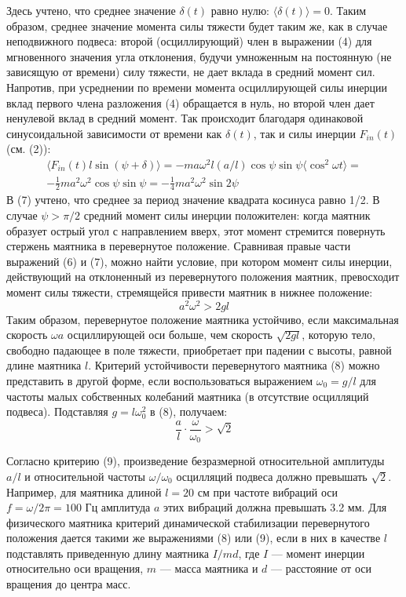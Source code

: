 \documentclass[a4paper,12pt]{article} %
\begin{document}
Здесь учтено, что среднее значение $\delta(t)$ равно нулю: $\langle\delta(t)\rangle = 0$. Таким образом, среднее значение момента силы тяжести будет таким же, как в случае неподвижного подвеса: второй (осциллирующий) член в выражении (4) для мгновенного значения угла отклонения, будучи умноженным на постоянную (не зависящую от времени) силу тяжести, не дает вклада в средний момент сил. Напротив, при усреднении по времени момента осциллирующей силы инерции вклад первого члена разложения (4) обращается в нуль, но второй член дает ненулевой вклад в средний момент. Так происходит благодаря одинаковой синусоидальной зависимости от времени как $\delta(t)$, так и силы инерции $F_{in}(t)$ (см. (2)):
\begin{eqnarray}
\langle F_{in}(t)l\sin(\psi + \delta)\rangle = -ma\omega^2l(a/l)\cos\psi\sin\psi\langle\cos^2\omega t\rangle = \nonumber\\
-\frac{1}{2}ma^2\omega^2\cos\psi\sin\psi = -\frac{1}{4}ma^2\omega^2\sin2\psi
\end{eqnarray}
В (7) учтено, что среднее за период значение квадрата косинуса равно 1/2. В случае $\psi > \pi/2$ средний момент силы инерции положителен: когда маятник образует острый угол с направлением вверх, этот момент стремится повернуть стержень маятника в перевернутое положение. Сравнивая правые части выражений (6) и (7), можно найти условие, при котором момент силы инерции, действующий на отклоненный из перевернутого положения маятник, превосходит момент силы тяжести, стремящейся привести маятник в нижнее положение:
\begin{equation}
a^2\omega^2 > 2gl
\end{equation}
Таким образом, перевернутое положение маятника устойчиво, если максимальная скорость $\omega a$ осциллирующей оси больше, чем скорость $\sqrt{2gl}$, которую тело, свободно падающее в поле тяжести, приобретает при падении с высоты, равной длине маятника $l$. Критерий устойчивости перевернутого маятника (8) можно представить в другой форме, если воспользоваться выражением $\omega_0 = g/l$ для частоты малых собственных колебаний маятника (в отсутствие осцилляций подвеса). Подставляя $g = l\omega_0^2$ в (8), получаем:
\begin{equation}
\frac{a}{l} \cdot\frac{\omega}{\omega_0} > \sqrt{2}
\end{equation}

Согласно критерию (9), произведение безразмерной относительной амплитуды $a/l$ и относительной частоты $\omega/\omega_0$ осцилляций подвеса должно превышать $\sqrt{2}$. Например, для маятника длиной $l = 20$ см при частоте вибраций оси $f = \omega/2\pi = 100$ Гц амплитуда $a$ этих вибраций должна превышать 3.2 мм. Для физического маятника критерий динамической стабилизации перевернутого положения дается такими же выражениями (8) или (9), если в них в качестве $l$ подставлять приведенную длину маятника $I/md$, где $I$ — момент инерции относительно оси вращения, $m$ — масса маятника и $d$ — расстояние от оси вращения до центра масс.
\end{document}
